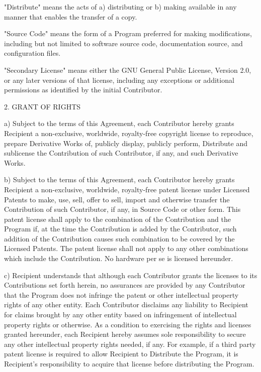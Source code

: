 "Distribute" means the acts of a) distributing or b) making available
in any manner that enables the transfer of a copy.

"Source Code" means the form of a Program preferred for making
modifications, including but not limited to software source code,
documentation source, and configuration files.

"Secondary License" means either the GNU General Public License,
Version 2.0, or any later versions of that license, including any
exceptions or additional permissions as identified by the initial
Contributor.

2. GRANT OF RIGHTS

a) Subject to the terms of this Agreement, each Contributor hereby
grants Recipient a non-exclusive, worldwide, royalty-free copyright
license to reproduce, prepare Derivative Works of, publicly display,
publicly perform, Distribute and sublicense the Contribution of such
Contributor, if any, and such Derivative Works.

b) Subject to the terms of this Agreement, each Contributor hereby
grants Recipient a non-exclusive, worldwide, royalty-free patent
license under Licensed Patents to make, use, sell, offer to sell,
import and otherwise transfer the Contribution of such Contributor,
if any, in Source Code or other form. This patent license shall
apply to the combination of the Contribution and the Program if, at
the time the Contribution is added by the Contributor, such addition
of the Contribution causes such combination to be covered by the
Licensed Patents. The patent license shall not apply to any other
combinations which include the Contribution. No hardware per se is
licensed hereunder.

c) Recipient understands that although each Contributor grants the
licenses to its Contributions set forth herein, no assurances are
provided by any Contributor that the Program does not infringe the
patent or other intellectual property rights of any other entity.
Each Contributor disclaims any liability to Recipient for claims
brought by any other entity based on infringement of intellectual
property rights or otherwise. As a condition to exercising the
rights and licenses granted hereunder, each Recipient hereby
assumes sole responsibility to secure any other intellectual
property rights needed, if any. For example, if a third party
patent license is required to allow Recipient to Distribute the
Program, it is Recipient's responsibility to acquire that license
before distributing the Program.

